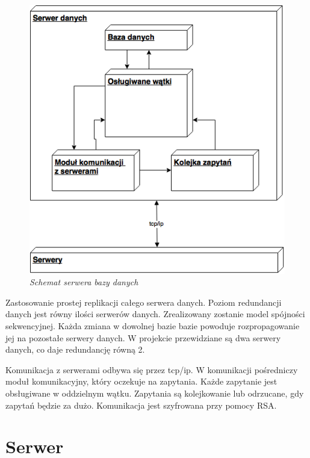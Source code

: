 \begin{figure}[!h]
    \begin{center}
    \includegraphics[angle=0,scale=0.75]{img/db.png}
    \end{center}
    \caption{\em Schemat serwera bazy danych}
    \label{fig:db}
\end{figure}

Zastosowanie prostej replikacji całego serwera danych. Poziom redundancji danych jest równy ilości serwerów danych. Zrealizowany zostanie model spójności sekwencyjnej. Każda zmiana w dowolnej bazie bazie powoduje rozpropagowanie jej na pozostałe serwery danych.
W projekcie przewidziane są dwa serwery danych, co daje redundancję równą 2.

Komunikacja z serwerami odbywa się przez tcp/ip. W komunikacji pośredniczy moduł komunikacyjny, który oczekuje na zapytania. Każde zapytanie jest obsługiwane w oddzielnym wątku. Zapytania są kolejkowanie lub odrzucane, gdy zapytań będzie za dużo. Komunikacja jest szyfrowana przy pomocy RSA.


\section{Serwer}

